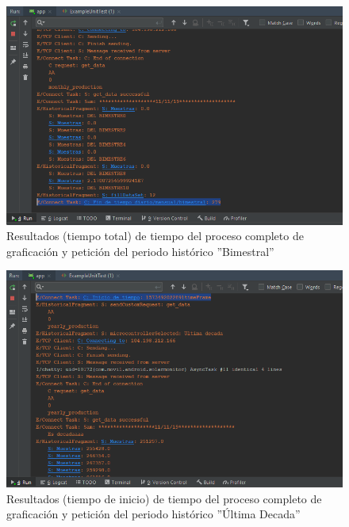 \begin{figure}[H]
	\centering
	\includegraphics[scale=.6]{Capitulo5/images/TiempoCompletoBimestral2.png}
	\caption{Resultados (tiempo total) de tiempo del proceso completo de graficación y petición del periodo histórico ''Bimestral''}	\label{fig:TiempoCompletoHBimestral2}
\end{figure} 
\begin{figure}[H]
	\centering
	\includegraphics[scale=.6]{Capitulo5/images/TiempoCompletoUltimaDecada.png}
	\caption{Resultados (tiempo de inicio) de tiempo del proceso completo de graficación y petición del periodo histórico ''Última Decada''}	\label{fig:TiempoCompletoHUltimaDecada}
\end{figure} 
